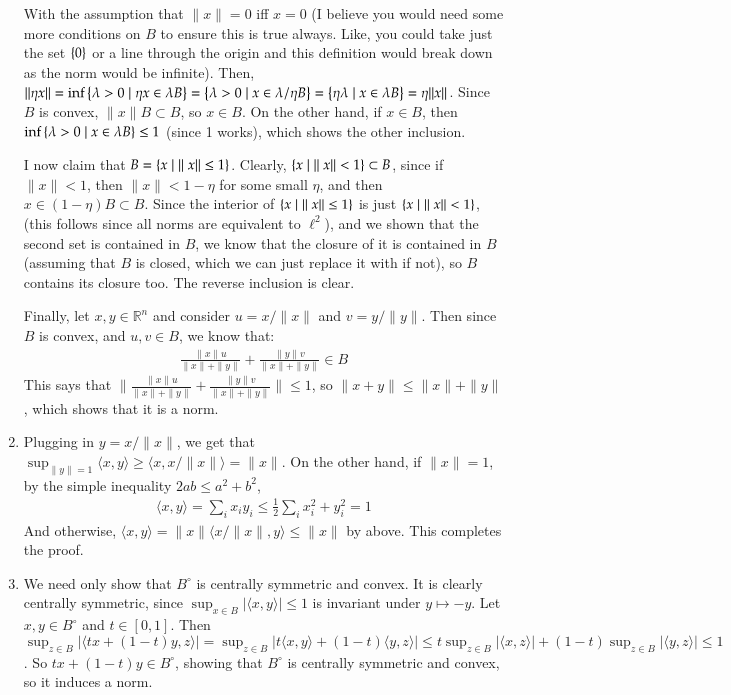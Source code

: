 \documentclass[12pt]{article}
\theoremstyle{definitionstyle}
\def\mbb#1{\mathbb{#1}}
\def\R{\mbb{R}}
\newcommand{\mg}[1]{\| #1 \|}
\renewcommand{\ip}[1]{\langle#1\rangle}
\newcommand{\SET}[1]{\Set{\mskip-\medmuskip #1 \mskip-\medmuskip}}
\newcommand{\1}{\mathds 1}
\begin{document}
\begin{enumerate}
        With the assumption that $\mg{x} = 0$ iff $x = 0$ (I believe you would need some more conditions on $B$ to ensure this is true always. Like, you could take just the set $\SET{0}$ or a line through the origin and this definition would break down as the norm would be infinite). Then, $\mg{\eta x} = \inf \SET{\lambda > 0 \mid \eta x \in \lambda B} = \SET{\lambda > 0 \mid x \in \lambda / \eta B} = \SET{\eta \lambda \mid x \in \lambda B} = \eta \mg{x}$. Since $B$ is convex, $\mg{x}B \subset B$, so $x \in B$. On the other hand, if $x \in B$, then $\inf \SET{\lambda > 0 \mid x \in \lambda B} \leq 1$ (since 1 works), which shows the other inclusion.

        I now claim that $B = \SET{x \mid \mg{x} \leq 1}$. Clearly, $\SET{x \mid \mg{x} < 1} \subset B$, since if $\mg{x} < 1$, then $\mg{x} < 1-\eta$ for some small $\eta$, and then $x \in (1-\eta)B \subset B$. Since the interior of $\SET{x \mid \mg{x} \leq 1}$ is just $\SET{x \mid \mg{x} < 1}$, (this follows since all norms are equivalent to $\ell^2$), and we shown that the second set is contained in $B$, we know that the closure of it is contained in $B$ (assuming that $B$ is closed, which we can just replace it with if not), so $B$ contains its closure too. The reverse inclusion is clear.
        
        Finally, let $x,y \in \R^n$ and consider $u = x/\mg{x}$ and $v = y/\mg{y}$. Then since $B$ is convex, and $u,v \in B$, we know that:
        \begin{align*}
            \frac{\mg{x} u}{\mg{x} + \mg{y}} + \frac{\mg{y} v}{\mg{x} + \mg{y}} \in B
        \end{align*}
        This says that $\mg{\frac{\mg{x} u}{\mg{x} + \mg{y}} + \frac{\mg{y} v}{\mg{x} + \mg{y}}} \leq 1$, so $\mg{x+y} \leq \mg{x} + \mg{y}$, which shows that it is a norm.

        \item Plugging in $y = x/\mg{x}$, we get that $\sup_{\mg{y} = 1} \ip{x,y} \geq \ip{x, x/\mg{x}} = \mg{x}$. On the other hand, if $\mg{x} = 1$, by the simple inequality $2ab \leq a^2+b^2$,
        \begin{align*}
            \ip{x,y} = \sum_i x_iy_i \leq \frac 12 \sum_i x_i^2 + y_i^2 = 1
        \end{align*}
        And otherwise, $\ip{x,y} = \mg{x} \ip{x/\mg{x}, y} \leq \mg{x}$ by above. This completes the proof.

        \item We need only show that $B^\circ$ is centrally symmetric and convex. It is clearly centrally symmetric, since $\sup_{x \in B} |\ip{x,y}| \leq 1$ is invariant under $y \mapsto -y$. Let $x, y \in B^\circ$ and $t \in [0,1]$. Then $\sup_{z \in B} |\ip{tx+(1-t)y, z}| = \sup_{z \in B} |t\ip{x,y} + (1-t)\ip{y,z}| \leq t \sup_{z \in B} |\ip{x,z}| + (1-t) \sup_{z \in B} |\ip{y,z}| \leq 1$. So $tx + (1-t)y \in B^\circ$, showing that $B^\circ$ is centrally symmetric and convex, so it induces a norm.


\end{enumerate}
\end{document}
